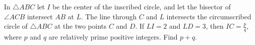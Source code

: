In $\triangle ABC$ let $I$ be the center of the inscribed circle, and let the bisector of $\angle ACB$ intersect $AB$ at $L$. The line through $C$ and $L$ intersects the circumscribed circle of $\triangle ABC$ at the two points $C$ and $D$. If $LI = 2$ and $LD = 3$, then $IC = \tfrac{p}{q}$, where $p$ and $q$ are relatively prime positive integers. Find $p + q$.